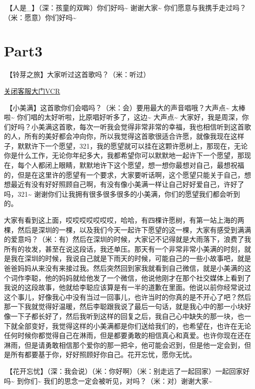 \documentclass[
]{book}
\begin{document}
🎵【人是\_】（深：孩童的双眸）你们好吗\textasciitilde{} 谢谢大家\textasciitilde{} 你们愿意与我携手走过吗？（米：愿意）你们好吗\textasciitilde{}

\section{Part3}\label{chengdu-20240615-part3}

🎵【铃芽之旅】大家听过这首歌吗？（米：听过）

\hyperref[close-door-vcr]{关闭客服大门VCR}

🎵【小美满】这首歌你们会唱吗？（米：会）要用最大的声音唱哦？大声点\textasciitilde{} 太棒啦\textasciitilde{} 你们唱的太好听啦，比原唱好听多了，这边\textasciitilde{} 大声点\textasciitilde{} 大家好，我是周深，你们好吗？小美满这首歌，每次一听我会觉得非常非常的幸福，我也相信听到这首歌的人，所有的美好都会冲向你，所以我觉得这首歌很适合许愿，就像我现在这样子，默默许下一个愿望，321，我的愿望就可以挂在这颗许愿树上，那现在，无论你是什么工作，无论你年纪多大，我都希望你可以默默地一起许下一个愿望，那现在，每个人都闭上眼睛，默默地许下这个愿望，想一想你最想对自己，最想祝福的，但是在这里许的愿望有一个要求，大家要听话啊，这个愿望只能关于自己，想想最近有没有好好照顾自己啊，有没有像小美满一样让自己好好爱自己，许好了吗，321\textasciitilde{} 谢谢你们让我拥有很多很多很多的小美满，你们的愿望我们都会听到的。

大家有看到这上面，哎哎哎哎哎哎哎，哈哈，有四棵许愿树，有第一站上海的两棵，然后是深圳的一棵，以及我们今天一起许下愿望的这一棵，大家有感受到满满的爱意吗？（米：有）然后在深圳的时候，大家记不记得就是大雨落下，浪费了我所有的妆发，甚至在说这段话，我还单压。那天有一个非常非常小美满的时刻，就是我在深圳的时候，我说自己就是下雨天的时候，可能自己的一些小故事吧，就是爸爸妈妈从来没有来接过我。然后突然回到家我就看到自己微信，就是小美满的这个词作李聪，他的妈妈就给他发了一个微信，他说他刚才在那个社交媒体上看到了我说的这段故事，他就给李聪应该算是有一半的道歉在里面。他说以前你经常说过这个事儿，好像我心中没有当过一回事儿，也许当时的你真的是不开心了吧？然后那一下我就觉得好温暖，然后李聪跟我说了最后一句话，就是我心中的那一小块好像一下子都长好了，然后我听到这样的回复之后，我自己心中缺失的那一块，也一下就全部变好，我觉得这样的小美满都是你们送给我们的，也希望在，也许在无论任何时候你都觉得自己在淋雨，但是都要勇敢的相信真心和真爱。也许你现在还在淋雨，但是请勇敢相信那个爱你的那一把伞，他可能会迟到，但是他一定会到，但是所有都要基于你，好好照顾好你自己。花开忘忧，愿你无忧。

🎵【花开忘忧】（深：我会说）（米：你好啊）（米：别走远了一起回家）一起回家好吗\textasciitilde{} 到你们\textasciitilde{} 我们的思念一定会被听见，对吗？（米：对）谢谢大家\textasciitilde{}
\end{document}
